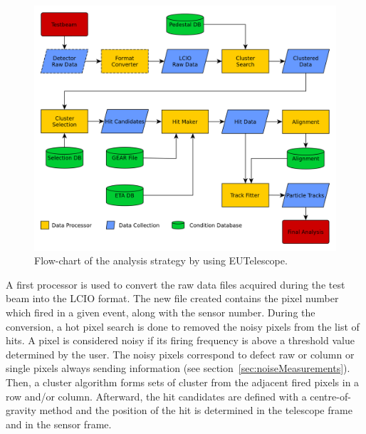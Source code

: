     \begin{figure}[!h]
      \centering
      \includegraphics[width = \textwidth]{Pictures/X0/eutel-strategy.png}
      \caption{Flow-chart of the analysis strategy by using EUTelescope\cite{EUTelFlowChart}.}
      \label{fig:eutel-strategy}
    \end{figure}

    A first processor is used to convert the raw data files acquired during the test beam into the LCIO format.
    The new file created contains the pixel number which fired in a given event, along with the sensor number.
    During the conversion, a hot pixel search is done to removed the noisy pixels from the list of hits.
    A pixel is considered noisy if its firing frequency is above a threshold value determined by the user.
    The noisy pixels correspond to defect raw or column or single pixels always sending information (see section~\ref{sec:noiseMeasurements}).
    Then, a cluster algorithm forms sets of cluster from the adjacent fired pixels in a row and/or column.
    Afterward, the hit candidates are defined with a centre-of-gravity method and the position of the hit is determined in the telescope frame and in the sensor frame.

